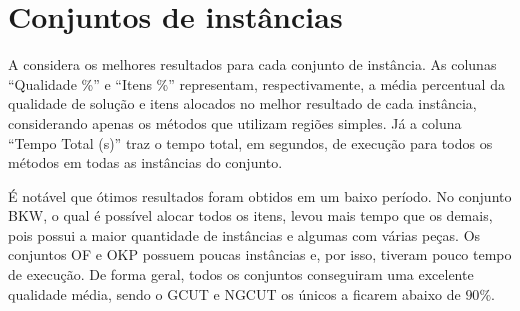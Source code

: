 \section{Conjuntos de instâncias}\label{sec:conjuntos-de-instancias}

A  considera os melhores resultados para cada conjunto de instância.
As colunas “Qualidade \%” e “Itens \%” representam, respectivamente, a média percentual da qualidade
de solução e itens alocados no melhor resultado de cada instância, considerando apenas os
métodos que utilizam regiões simples.
Já a coluna “Tempo Total (s)” traz o tempo total, em segundos, de execução para todos os métodos
em todas as instâncias do conjunto.



É notável que ótimos resultados foram obtidos em um baixo período.
No conjunto BKW, o qual é possível alocar todos os itens, levou mais tempo que os demais, pois
possui a maior quantidade de instâncias e algumas com várias peças.
Os conjuntos OF e OKP possuem poucas instâncias e, por isso, tiveram pouco tempo de execução.
De forma geral, todos os conjuntos conseguiram uma excelente qualidade média, sendo o GCUT e NGCUT
os únicos a ficarem abaixo de $90\%$.

